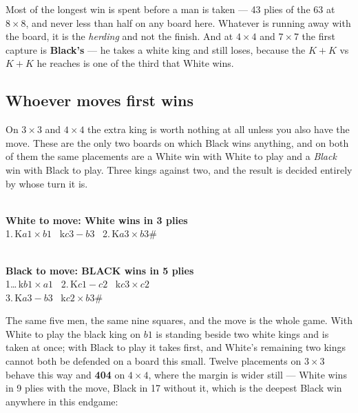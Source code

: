 \documentclass[11pt]{article}
\begin{document}
\noindent
Most of the longest win is spent before a man is taken --- 43 plies of the 63 at
$8\times8$, and never less than half on any board here. Whatever is running away
with the board, it is the \emph{herding} and not the finish. And at $4\times4$ and
$7\times7$ the first capture is \textbf{Black's} --- he takes a white king and
still loses, because the $K\!+\!K$ vs $K\!+\!K$ he reaches is one of the third
that White wins.

\subsection{Whoever moves first wins}\label{sub:kings-tempo}

\noindent
On $3\times3$ and $4\times4$ the extra king is worth nothing at all unless you
also have the move. These are the only two boards on which Black wins anything,
and on both of them the same placements are a White win with White to play and a
\emph{Black} win with Black to play. Three kings against two, and the result is
decided entirely by whose turn it is.

\smallskip

\begin{minipage}{0.47\textwidth}\centering
  \\[1.5mm]
  {\scriptsize\color{inksoft}\textbf{White to move: White wins in 3 plies}\\
   1.\,K$a1\times b1$ \ k$c3-b3$ \ 2.\,K$a3\times b3$\#}
\end{minipage}\hfill
\begin{minipage}{0.47\textwidth}\centering
  \\[1.5mm]
  {\scriptsize\color{inksoft}\textbf{Black to move: BLACK wins in 5 plies}\\
   1\ldots\,k$b1\times a1$ \ 2.\,K$c1-c2$ \ k$c3\times c2$\\
   3.\,K$a3-b3$ \ k$c2\times b3$\#}
\end{minipage}

\smallskip

\noindent
The same five men, the same nine squares, and the move is the whole game. With
White to play the black king on $b1$ is standing beside two white kings and is
taken at once; with Black to play it takes first, and White's remaining two
kings cannot both be defended on a board this small. Twelve placements on
$3\times3$ behave this way and \textbf{404} on $4\times4$, where the margin is
wider still --- White wins in 9 plies with the move, Black in 17 without it,
which is the deepest Black win anywhere in this endgame:
\end{document}
